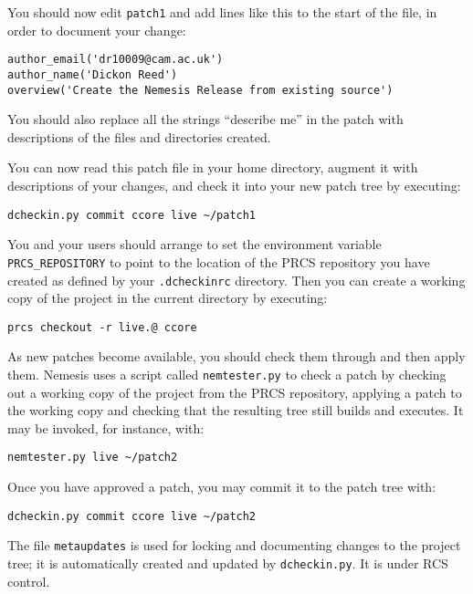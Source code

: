 \documentclass{article}
\begin{document}
You should now edit \texttt{patch1} and add lines like this to the
start of the file, in order to document your change:

\begin{verbatim}
author_email('dr10009@cam.ac.uk')
author_name('Dickon Reed')
overview('Create the Nemesis Release from existing source')
\end{verbatim}

You should also replace all the strings ``describe me'' in the patch
with descriptions of the files and directories created. 

You can now read this patch file in your home directory, augment it
with descriptions of your changes, and check it into your new patch
tree by executing:

\begin{verbatim}
dcheckin.py commit ccore live ~/patch1
\end{verbatim}

You and your users should arrange to set the environment variable
\texttt{PRCS\_REPOSITORY} to point to the location of the PRCS
repository you have created as defined by your \texttt{.dcheckinrc}
directory. Then you can create a working copy of the project in the
current directory by executing:

\begin{verbatim}
prcs checkout -r live.@ ccore
\end{verbatim}

As new patches become available, you should check them through and
then apply them. Nemesis uses a script called \texttt{nemtester.py} to
check a patch by checking out a working copy of the project from the
PRCS repository, applying a patch to the working copy and checking
that the resulting tree still builds and executes. It may be invoked,
for instance, with:

\begin{verbatim}
nemtester.py live ~/patch2
\end{verbatim}

Once you have approved a patch, you may commit it to the patch tree
with:

\begin{verbatim}
dcheckin.py commit ccore live ~/patch2
\end{verbatim}

The file \texttt{metaupdates} is used for locking and documenting
changes to the project tree; it is automatically created and updated
by \texttt{dcheckin.py}. It is under RCS control.
\end{document}
